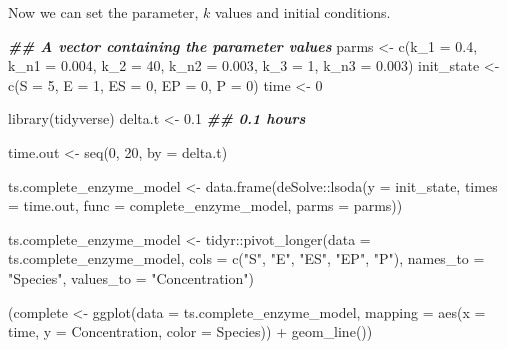 \documentclass[
]{article}
\newenvironment{Shaded}{\begin{snugshade}}{\end{snugshade}}
\newcommand{\AttributeTok}[1]{\textcolor[rgb]{0.77,0.63,0.00}{#1}}
\newcommand{\DecValTok}[1]{\textcolor[rgb]{0.00,0.00,0.81}{#1}}
\newcommand{\DocumentationTok}[1]{\textcolor[rgb]{0.56,0.35,0.01}{\textbf{\textit{#1}}}}
\newcommand{\FloatTok}[1]{\textcolor[rgb]{0.00,0.00,0.81}{#1}}
\newcommand{\FunctionTok}[1]{\textcolor[rgb]{0.00,0.00,0.00}{#1}}
\newcommand{\NormalTok}[1]{#1}
\newcommand{\OtherTok}[1]{\textcolor[rgb]{0.56,0.35,0.01}{#1}}
\newcommand{\SpecialCharTok}[1]{\textcolor[rgb]{0.00,0.00,0.00}{#1}}
\newcommand{\StringTok}[1]{\textcolor[rgb]{0.31,0.60,0.02}{#1}}
\begin{document}
Now we can set the parameter, \(k\) values and initial conditions.

\begin{Shaded}
\begin{Highlighting}[]
\DocumentationTok{\#\# A vector containing the parameter values}
\NormalTok{parms }\OtherTok{\textless{}{-}} \FunctionTok{c}\NormalTok{(}\AttributeTok{k\_1 =} \FloatTok{0.4}\NormalTok{, }\AttributeTok{k\_n1 =} \FloatTok{0.004}\NormalTok{, }\AttributeTok{k\_2 =} \DecValTok{40}\NormalTok{, }\AttributeTok{k\_n2 =} \FloatTok{0.003}\NormalTok{, }
    \AttributeTok{k\_3 =} \DecValTok{1}\NormalTok{, }\AttributeTok{k\_n3 =} \FloatTok{0.003}\NormalTok{)}
\NormalTok{init\_state }\OtherTok{\textless{}{-}} \FunctionTok{c}\NormalTok{(}\AttributeTok{S =} \DecValTok{5}\NormalTok{, }\AttributeTok{E =} \DecValTok{1}\NormalTok{, }\AttributeTok{ES =} \DecValTok{0}\NormalTok{, }\AttributeTok{EP =} \DecValTok{0}\NormalTok{, }\AttributeTok{P =} \DecValTok{0}\NormalTok{)}
\NormalTok{time }\OtherTok{\textless{}{-}} \DecValTok{0}

\FunctionTok{library}\NormalTok{(tidyverse)}
\NormalTok{delta.t }\OtherTok{\textless{}{-}} \FloatTok{0.1}  \DocumentationTok{\#\# 0.1 hours}

\NormalTok{time.out }\OtherTok{\textless{}{-}} \FunctionTok{seq}\NormalTok{(}\DecValTok{0}\NormalTok{, }\DecValTok{20}\NormalTok{, }\AttributeTok{by =}\NormalTok{ delta.t)}

\NormalTok{ts.complete\_enzyme\_model }\OtherTok{\textless{}{-}} \FunctionTok{data.frame}\NormalTok{(deSolve}\SpecialCharTok{::}\FunctionTok{lsoda}\NormalTok{(}\AttributeTok{y =}\NormalTok{ init\_state, }
    \AttributeTok{times =}\NormalTok{ time.out, }\AttributeTok{func =}\NormalTok{ complete\_enzyme\_model, }
    \AttributeTok{parms =}\NormalTok{ parms))}

\NormalTok{ts.complete\_enzyme\_model }\OtherTok{\textless{}{-}}\NormalTok{ tidyr}\SpecialCharTok{::}\FunctionTok{pivot\_longer}\NormalTok{(}\AttributeTok{data =}\NormalTok{ ts.complete\_enzyme\_model, }
    \AttributeTok{cols =} \FunctionTok{c}\NormalTok{(}\StringTok{"S"}\NormalTok{, }\StringTok{"E"}\NormalTok{, }\StringTok{"ES"}\NormalTok{, }\StringTok{"EP"}\NormalTok{, }\StringTok{"P"}\NormalTok{), }\AttributeTok{names\_to =} \StringTok{"Species"}\NormalTok{, }
    \AttributeTok{values\_to =} \StringTok{"Concentration"}\NormalTok{)}

\NormalTok{(complete }\OtherTok{\textless{}{-}} \FunctionTok{ggplot}\NormalTok{(}\AttributeTok{data =}\NormalTok{ ts.complete\_enzyme\_model, }
    \AttributeTok{mapping =} \FunctionTok{aes}\NormalTok{(}\AttributeTok{x =}\NormalTok{ time, }\AttributeTok{y =}\NormalTok{ Concentration, }\AttributeTok{color =}\NormalTok{ Species)) }\SpecialCharTok{+} 
    \FunctionTok{geom\_line}\NormalTok{())}
\end{Highlighting}
\end{Shaded}
\end{document}
